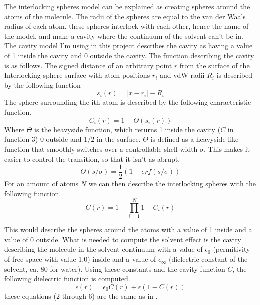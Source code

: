 \documentclass[a4paper,11pt]{article}
\begin{document}
The interlocking spheres model can be explained as creating spheres
around the atoms of the molecule. The radii of the spheres are equal
to the van der Waals radius of each atom. these spheres interlock with
each other, hence the name of the model, and make a cavity where the
continuum of the solvent can't be in.  The cavity model I'm using in
this project describes the cavity as having a value of 1 inside the
cavity and 0 outside the cavity. The function describing the cavity is
as follows.  The signed distance of an arbitrary point $r$ from the
surface of the Interlocking-sphere surface with atom positions $r_i$
and \ac{vdW} radii $R_i$ is described by the following function
\begin{equation}
s_i(r) = \vert r - r_i\vert - R_i
\end{equation}
The sphere surrounding the ith atom is described by the following characteristic function.
\begin{equation}
C_i(r) = 1 - \Theta (s_i(r))
\end{equation}
Where $\Theta$ is the heavyside function, which returns 1 inside the
cavity ($C$ in function 3) 0 outside and $1/2$ in the
surface. $\Theta$ is defined as a heavyside-like function that
smoothly switches over a controllable shell width $\sigma$. This makes
it easier to control the transition, so that it isn't as abrupt.
\begin{equation}
\Theta (s/\sigma) = \frac{1}{2} (1 + erf(s/\sigma))
\end{equation}
For an amount of atoms $N$ we can then describe the interlocking spheres with the following function.
\begin{equation}
C(r) = 1 - \prod_{i=1}^{N} 1 - C_i (r)
\end{equation}

This would describe the spheres around the atoms with a value of 1
inside and a value of 0 outside. What is needed to compute the solvent
effect is the cavity describing the molecule in the solvent continuum
with a value of $\epsilon_0$ (permitivity of free space with value
1.0) inside and a value of $\epsilon_\infty$ (dielectric constant of
the solvent, ca. 80 for water). Using these constants and the cavity
function $C$, the following dielectric function is computed.
\begin{equation}
\epsilon (r) = \epsilon_0 C(r) + \epsilon (1 - C(r))
\end{equation}
these equations (2 through 6) are the same as in \cite{FossoTande:2013ka}.
\end{document}
